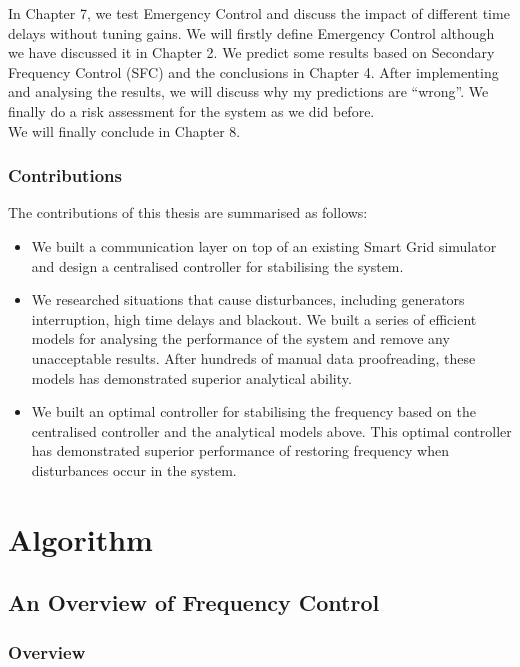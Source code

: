 \documentclass{report}
\begin{document}
In Chapter 7, we test Emergency Control and discuss the impact of different time delays without tuning gains. We will firstly define Emergency Control although we have discussed it in Chapter 2. We predict some results based on Secondary Frequency Control (SFC) and the conclusions in Chapter 4. After implementing and analysing the results, we will discuss why my predictions are “wrong”. We finally do a risk assessment for the system as we did before.\\

We will finally conclude in Chapter 8.\\

\section{Contributions}
The contributions of this thesis are summarised as follows:\\
\begin{itemize}
  \item We built a communication layer on top of an existing Smart Grid simulator and design a centralised controller for stabilising the system.\\
  
  \item We researched situations that cause disturbances, including generators interruption, high time delays and blackout. We built a series of efficient models for analysing the performance of the system and remove any unacceptable results. After hundreds of manual data proofreading, these models has demonstrated superior analytical ability.\\
  
  \item We built an optimal controller for stabilising the frequency based on the centralised controller and the analytical models above. This optimal controller has demonstrated superior performance of restoring frequency when disturbances occur in the system.\\
\end{itemize}


\part{Algorithm}
\chapter{An Overview of Frequency Control}
\label{chap:2}
\section{Overview}
\end{document}
